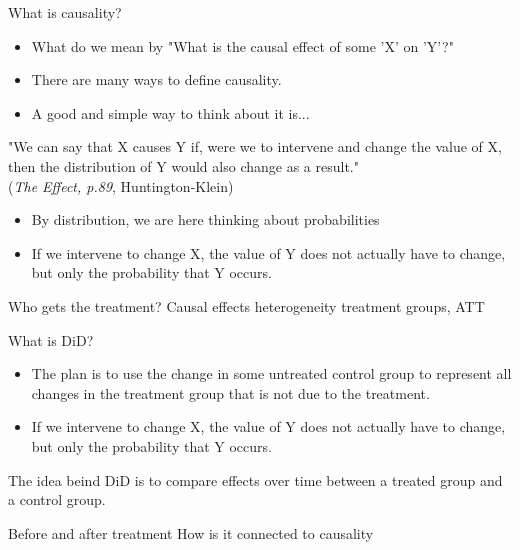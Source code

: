 \documentclass[notes,11pt, aspectratio=169]{beamer}
\begin{document}
\begin{frame}{What is causality?}
    \begin{itemize}
        \item What do we mean by "What is the causal effect of some 'X' on 'Y'?"
        \item There are many ways to define causality.
        \item A good and simple way to think about it is...
    \end{itemize}

    \begin{displayquote}
"We can say that X causes Y if, were we to intervene and change the value of X, then the distribution of Y would also change as a result."
\\
\flushright\tiny (\emph{The Effect, p.89}, Huntington-Klein)
\end{displayquote}
\normalsize
\begin{itemize}
        \item By distribution, we are here thinking about probabilities
        \item If we intervene to change X, the value of Y does not actually have to change, but only the probability that Y occurs. 
    \end{itemize}
\end{frame}

\begin{frame}{Who gets the treatment?}
Causal effects heterogeneity
treatment groups, ATT 
\end{frame}

\begin{frame}{What is DiD?}
\begin{itemize}
        \item The plan is to use the change in some untreated control group to represent all changes in the treatment group that is not due to the treatment. 
        
        \item If we intervene to change X, the value of Y does not actually have to change, but only the probability that Y occurs. 
    \end{itemize}

The idea beind DiD is to compare effects over time between a treated group and a control group.

Before and after treatment
How is it connected to causality

\end{frame}
\end{document}
